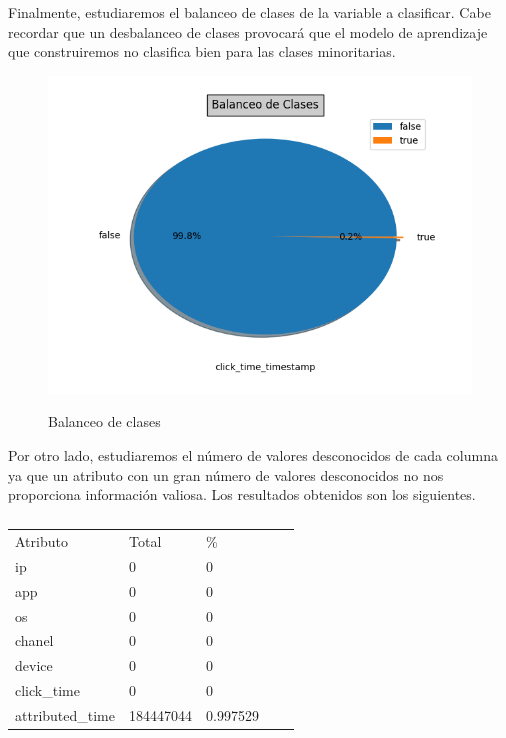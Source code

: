 Finalmente, estudiaremos el balanceo de clases de la variable a clasificar. Cabe recordar que un desbalanceo de clases provocará que el modelo de aprendizaje que construiremos no clasifica bien para las clases minoritarias.
\begin{figure}[H]
\includegraphics[scale=0.75]{img/imbalacing.png}
\label{}
\caption{Balanceo de clases}
\end{figure}
Por otro lado, estudiaremos el número de valores desconocidos de cada columna ya que un atributo con un gran número de valores desconocidos no nos proporciona información valiosa. Los resultados obtenidos son los siguientes.
\begin{table}[H]
	\centering
	\begin{tabular}{lllll}
	Atributo& Total & \%    \\
	ip	& 0 &0 \\
	app	& 0 & 0   \\
	os	& 0 & 0 \\
	chanel &0 & 0 \\
	device & 0 & 0  \\
	click\_time& 0& 0 \\
	attributed\_time &184447044& 0.997529
	\end{tabular}
	\caption{}
\label{}
\end{table}
